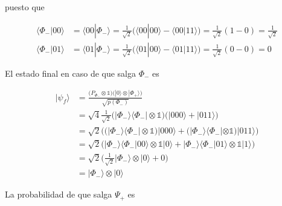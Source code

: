 \documentclass{article}
\begin{document}
puesto que 

\begin{align*}
  \langle \Phi_-|00\rangle 
    &= \langle 00|\Phi_-\rangle 
    = \frac{1}{\sqrt{2}}\Big(
    \langle 00|00\rangle - \langle 00|11\rangle\Big)
    = \frac{1}{\sqrt{2}}(1 - 0)
    = \frac{1}{\sqrt{2}} \\
  \langle \Phi_-|01\rangle
    &=\langle 01|\Phi_-\rangle 
    = \frac{1}{\sqrt{2}}\Big(
      \langle 01|00\rangle - \langle 01|11\rangle\Big)
    = \frac{1}{\sqrt{2}}(0 - 0)
    = 0
\end{align*}

El estado final en caso de que salga $\Phi_-$ es 

\begin{align*}
  |\psi_f\rangle &= \frac
    {\Big(P_{\Phi_-} \otimes \mathbb{1}\Big)
    \Big(|0\rangle\otimes|\Phi_+\rangle\Big)}
    {\sqrt{p(\Phi_-)}} \\ 
  &= \sqrt{4}\frac{1}{\sqrt{2}}
    \Big(|\Phi_-\rangle\langle \Phi_-| \otimes \mathbb{1}\Big)
    \Big(|000\rangle + |011\rangle\Big) \\
  &= \sqrt{2}\Big(
  \big(|\Phi_-\rangle\langle \Phi_-| \otimes \mathbb{1}\big)|000
    \rangle +
  \big(|\Phi_-\rangle\langle \Phi_-| \otimes \mathbb{1}\big)|011
    \rangle
  \Big) \\ 
  &= \sqrt{2}\Big(
  |\Phi_-\rangle\langle \Phi_-|00\rangle \otimes 
    \mathbb{1}|0\rangle +
  |\Phi_-\rangle\langle \Phi_-|01\rangle \otimes 
    \mathbb{1}|1\rangle
  \Big) \\ 
  &= \sqrt{2}\Big(
    \frac{1}{\sqrt{2}}|\Phi_-\rangle \otimes |0 \rangle + 0
  \Big) \\ 
  &= |\Phi_-\rangle \otimes |0 \rangle
\end{align*}

La probabilidad de que salga $\Psi_+$ es
\end{document}
